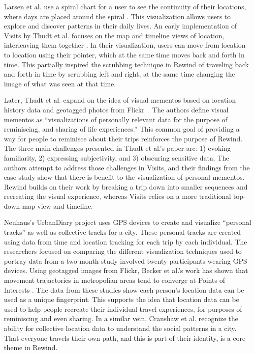 \documentclass{sigchi}
\begin{document}
Larsen et al. use a spiral chart for a user to see the continuity of their locations, where days are placed around the spiral \cite{larsen2013qs}. This visualization allows users to explore and discover patterns in their daily lives. An early implementation of Visits by Thudt et al. focuses on the map and timeline views of location, interleaving them together \cite{thudt2013visits}. In their visualization, users can move from location to location using their pointer, which at the same time moves back and forth in time. This partially inspired the scrubbing technique in Rewind of traveling back and forth in time by scrubbing left and right, at the same time changing the image of what was seen at that time.
 
Later, Thudt et al. expand on the idea of visual mementos based on location history data and geotagged photos from Flickr~\cite{thudt2016visual}. The authors define visual mementos as ``visualizations of personally relevant data for the purpose of reminiscing, and sharing of life experiences.'' This common goal of providing a way for people to reminisce about their trips reinforces the purpose of Rewind.
The three main challenges presented in Thudt et al.'s paper are: 1) evoking familiarity, 2) expressing subjectivity, and 3) obscuring sensitive data. The authors attempt to address those challenges in Visits, and their findings from the case study show that there is benefit to the visualization of personal mementos. Rewind builds on their work by breaking a trip down into smaller sequences and recreating the visual experience, whereas Visits relies on a more traditional top-down map view and timeline.

Neuhaus's UrbanDiary project \cite{neuhaus2010urbandiary} uses GPS devices to create and visualize ``personal tracks'' as well as collective tracks for a city. These personal tracks are created using data from time and location tracking for each trip by each individual. The researchers focused on comparing the different visualization techniques used to portray data from a two-month study involved twenty participants wearing GPS devices. Using geotagged images from Flickr, Becker et al.'s work has shown that movement trajactories in metropolian areas tend to converge at Points of Interests \cite{Becker2015}. The data from these studies show each person's location data can be used as a unique fingerprint. This supports the idea that location data can be used to help people recreate their individual travel experiences, for purposes of reminiscing and even sharing. In a similar vein, Cranshaw et al. \cite{cranshaw2012livehoods} recognize the ability for collective location data to understand the social patterns in a city. That everyone travels their own path, and this is part of their identity, is a core theme in Rewind.
\end{document}
